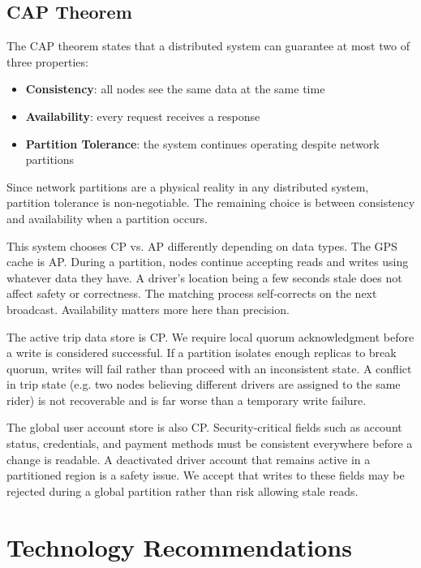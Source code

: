 \documentclass[12pt]{article}
\begin{document}
\subsection{CAP Theorem}

The CAP theorem\cite{captheorem} states that a distributed system can guarantee at most two of three properties:
\begin{itemize}
    \item \textbf{Consistency}: all nodes see the same data at the same time
    \item \textbf{Availability}: every request receives a response
    \item \textbf{Partition Tolerance}: the system continues operating despite network partitions
\end{itemize}

Since network partitions are a physical reality in any distributed system, partition tolerance is non-negotiable. The remaining choice is between consistency and availability when a partition occurs.

This system chooses CP vs. AP differently depending on data types. The GPS cache is AP. During a partition, nodes continue accepting reads and writes using whatever data they have. A driver's location being a few seconds stale does not affect safety or correctness. The matching process self-corrects on the next broadcast. Availability matters more here than precision.

The active trip data store is CP. We require local quorum acknowledgment before a write is considered successful. If a partition isolates enough replicas to break quorum, writes will fail rather than proceed with an inconsistent state. A conflict in trip state (e.g. two nodes believing different drivers are assigned to the same rider) is not recoverable and is far worse than a temporary write failure.

The global user account store is also CP. Security-critical fields such as account status, credentials, and payment methods must be consistent everywhere before a change is readable. A deactivated driver account that remains active in a partitioned region is a safety issue. We accept that writes to these fields may be rejected during a global partition rather than risk allowing stale reads.

\section{Technology Recommendations}
\label{sec:technology-recommendations}
\end{document}

